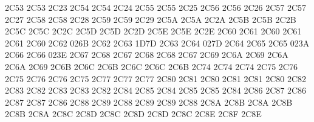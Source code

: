 \setcclcuc 2C53 2C53 2C23 %
\setcclcuc 2C54 2C54 2C24 %
\setcclcuc 2C55 2C55 2C25 %
\setcclcuc 2C56 2C56 2C26 %
\setcclcuc 2C57 2C57 2C27 %
\setcclcuc 2C58 2C58 2C28 %
\setcclcuc 2C59 2C59 2C29 %
\setcclcuc 2C5A 2C5A 2C2A %
\setcclcuc 2C5B 2C5B 2C2B %
\setcclcuc 2C5C 2C5C 2C2C %
\setcclcuc 2C5D 2C5D 2C2D %
\setcclcuc 2C5E 2C5E 2C2E %
\setcclcuc 2C60 2C61 2C60 %
\setcclcuc 2C61 2C61 2C60 %
\setcclcuc 2C62 026B 2C62 %
\setcclcuc 2C63 1D7D 2C63 %
\setcclcuc 2C64 027D 2C64 %
\setcclcuc 2C65 2C65 023A %
\setcclcuc 2C66 2C66 023E %
\setcclcuc 2C67 2C68 2C67 %
\setcclcuc 2C68 2C68 2C67 %
\setcclcuc 2C69 2C6A 2C69 %
\setcclcuc 2C6A 2C6A 2C69 %
\setcclcuc 2C6B 2C6C 2C6B %
\setcclcuc 2C6C 2C6C 2C6B %
\setcclcuc 2C74 2C74 2C74 %
\setcclcuc 2C75 2C76 2C75 %
\setcclcuc 2C76 2C76 2C75 %
\setcclcuc 2C77 2C77 2C77 %
\setcclcuc 2C80 2C81 2C80 %
\setcclcuc 2C81 2C81 2C80 %
\setcclcuc 2C82 2C83 2C82 %
\setcclcuc 2C83 2C83 2C82 %
\setcclcuc 2C84 2C85 2C84 %
\setcclcuc 2C85 2C85 2C84 %
\setcclcuc 2C86 2C87 2C86 %
\setcclcuc 2C87 2C87 2C86 %
\setcclcuc 2C88 2C89 2C88 %
\setcclcuc 2C89 2C89 2C88 %
\setcclcuc 2C8A 2C8B 2C8A %
\setcclcuc 2C8B 2C8B 2C8A %
\setcclcuc 2C8C 2C8D 2C8C %
\setcclcuc 2C8D 2C8D 2C8C %
\setcclcuc 2C8E 2C8F 2C8E %
